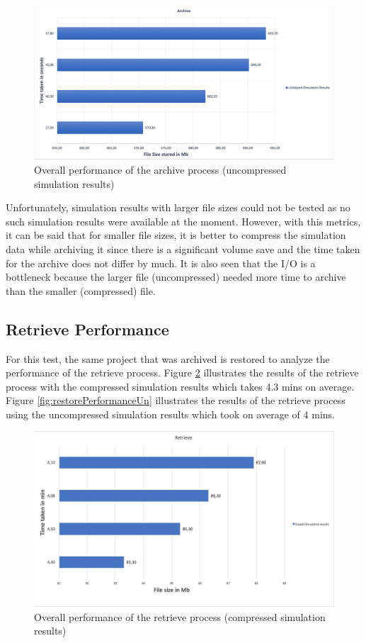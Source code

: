 \begin{figure}[H]
    \centering \includegraphics[scale=0.45]{grafiken/archiveUnzip.png}
    \caption{Overall performance of the archive process (uncompressed simulation results)}
    \label{fig:archivePerformanceUn}
\end{figure}

Unfortunately, simulation results with larger file sizes could not be tested as no such simulation results were available at the moment. However, with this metrics, it can be said that
for smaller file sizes, it is better to compress the simulation data while archiving it since there is a significant volume save and the time taken for the
archive does not differ by much. It is also seen that the I/O is a bottleneck because the larger file (uncompressed) needed more time to archive than the smaller (compressed) file. 

\subsection{Retrieve Performance}
For this test, the same project that was archived is restored to analyze the performance of the retrieve process. Figure \ref{fig:restorePerformance} illustrates
the results of the retrieve process with the compressed simulation results which takes 4.3 mins on average. Figure \ref{fig:restorePerformanceUn} illustrates the
results of the retrieve process using the uncompressed simulation results which took on average of 4 mins. 

\begin{figure}[H]
    \centering \includegraphics[scale=0.5]{grafiken/retrieveZip.png}
    \caption{Overall performance of the retrieve process (compressed simulation results)}
    \label{fig:restorePerformance}
\end{figure}

